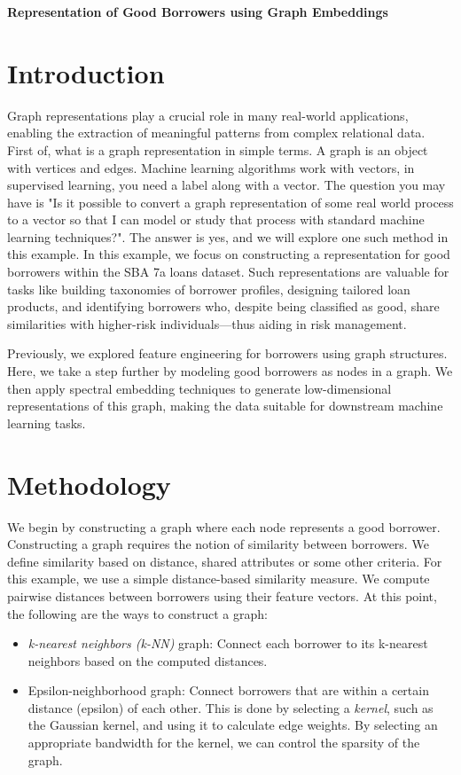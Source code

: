 \documentclass[12pt]{article}
\begin{document}
\begin{tcolorbox}[halign=flush center]
         \textbf{Representation of Good Borrowers using Graph Embeddings}
   
 \end{tcolorbox}

\section{Introduction}
Graph representations play a crucial role in many real-world applications, enabling the extraction of meaningful patterns from complex relational data. First of, what is a graph representation in simple terms. A graph is an object with vertices and edges. Machine learning algorithms work with vectors, in supervised learning, you need a label along with a vector. The question you may have is "Is it possible to convert a graph representation of some real world process to a vector so that I can model or study that process with standard machine learning techniques?". The answer is yes, and we will explore one such method in this example. In this example, we focus on constructing a representation for good borrowers within the SBA 7a loans dataset. Such representations are valuable for tasks like building taxonomies of borrower profiles, designing tailored loan products, and identifying borrowers who, despite being classified as good, share similarities with higher-risk individuals—thus aiding in risk management.

Previously, we explored feature engineering for borrowers using graph structures. Here, we take a step further by modeling good borrowers as nodes in a graph. We then apply spectral embedding techniques to generate low-dimensional representations of this graph, making the data suitable for downstream machine learning tasks.

\section{Methodology}
We begin by constructing a graph where each node represents a good borrower. Constructing a graph requires the notion of similarity between borrowers. We define similarity based on distance, shared attributes or some other criteria. For this example, we use a simple distance-based similarity measure. We compute pairwise distances between borrowers using their feature vectors. At this point, the following are the ways to construct a graph:
\begin{itemize}
    \item \emph{k-nearest neighbors (k-NN)} graph: Connect each borrower to its k-nearest neighbors based on the computed distances.
    \item Epsilon-neighborhood graph: Connect borrowers that are within a certain distance (epsilon) of each other. This is done by selecting a \emph{kernel}, such as the Gaussian kernel, and using it to calculate edge weights. By selecting an appropriate bandwidth for the kernel, we can control the sparsity of the graph.
\end{itemize}
\end{document}
